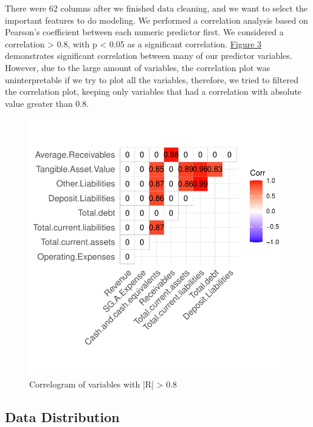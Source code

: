 \documentclass[11pt,]{article}
\begin{document}
There were 62 columns after we finished data cleaning, and we want to
select the important features to do modeling. We performed a correlation
analysis based on Pearson's coefficient between each numeric predictor
first. We considered a \textbar correlation\textbar{} \textgreater{}
0.8, with p \textless{} 0.05 as a significant correlation.
\hyperref[sec:fig3]{Figure 3} demonstrates significant correlation
between many of our predictor variables. However, due to the large
amount of variables, the correlation plot was uninterpretable if we try
to plot all the variables, therefore, we tried to filtered the
correlation plot, keeping only variables that had a correlation with
absolute value greater than 0.8.

\begin{figure}

{\centering \includegraphics{stock_analysis_files/figure-latex/corrplot-1} 

}

\caption{Correlogram of variables with |R| > 0.8}\label{fig:corrplot}
\end{figure}

\hypertarget{data-distribution}{%
\subsection{Data Distribution}\label{data-distribution}}
\end{document}
